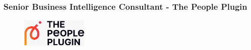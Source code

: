 \documentclass[12pt]{article}
\begin{document}
            \newpage



            \subsubsection{Senior Business Intelligence Consultant - The People Plugin}

                \begin{figure}[!h]
                    \centering
                    \includegraphics[width=0.3\textwidth]{Recursos/Img/PeoplePluginLogo.png}
                \end{figure}
\end{document}
